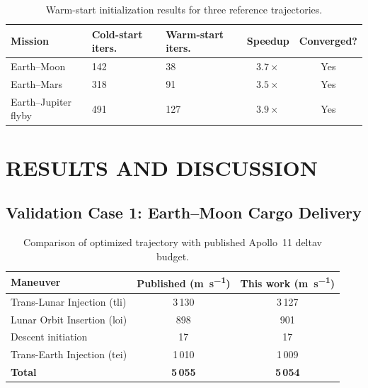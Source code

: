 \documentclass[dissertation, bookmarks]{../example/tex/grizz_thesis}
\begin{document}
\blindtext[2]

\begin{table}[htbp]
  \caption{Warm-start initialization results for three reference trajectories.}
  \label{tab:ch3-warmstart}
  \centering
  \begin{tabular}{lC{1in}C{1in}cc}
    \toprule
    \textbf{Mission} & \textbf{Cold-start iters.} & \textbf{Warm-start iters.} & \textbf{Speedup} & \textbf{Converged?} \\
    \midrule
    Earth--Moon   & 142 & 38  & $3.7\times$ & Yes \\
    Earth--Mars   & 318 & 91  & $3.5\times$ & Yes \\
    Earth--Jupiter flyby & 491 & 127 & $3.9\times$ & Yes \\
    \bottomrule
  \end{tabular}
\end{table}

\blindtext

\chapter{RESULTS AND DISCUSSION}

\section{Validation Case 1: Earth--Moon Cargo Delivery}

\blindtext[2]

\begin{table}[htbp]
  \caption{Comparison of optimized trajectory with published Apollo~11 \gls{deltav} budget.}
  \label{tab:ch4-moon-validation}
  \centering
  \begin{tabular}{L{2.7in}cc}
    \toprule
    \textbf{Maneuver} & \textbf{Published} (\si{\meter\per\second}) & \textbf{This work} (\si{\meter\per\second}) \\
    \midrule
    Trans-Lunar Injection (\gls{tli}) & 3\,130 & 3\,127 \\
    Lunar Orbit Insertion (\gls{loi}) & 898   & 901   \\
    Descent initiation                & 17    & 17    \\
    Trans-Earth Injection (\gls{tei}) & 1\,010 & 1\,009 \\
    \midrule
    \textbf{Total}                    & \textbf{5\,055} & \textbf{5\,054} \\
    \bottomrule
  \end{tabular}
\end{table}
\end{document}
